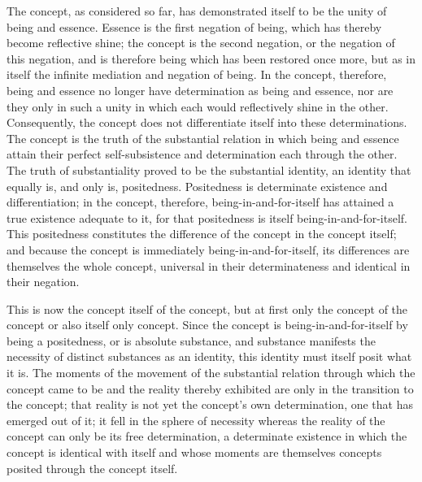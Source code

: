 The concept, as considered so far,
has demonstrated itself to be
the unity of being and essence.
Essence is the first negation of being,
which has thereby become reflective shine;
the concept is the second negation,
or the negation of this negation,
and is therefore being
which has been restored once more,
but as in itself the infinite mediation
and negation of being.
In the concept, therefore,
being and essence no longer have
determination as being and essence,
nor are they only in such a unity
in which each would reflectively shine in the other.
Consequently, the concept does not differentiate
itself into these determinations.
The concept is the truth of the substantial relation
in which being and essence attain their perfect
self-subsistence and determination each through the other.
The truth of substantiality proved
to be the substantial identity,
an identity that equally is,
and only is, positedness.
Positedness is determinate existence and differentiation;
in the concept, therefore, being-in-and-for-itself
has attained a true existence adequate to it,
for that positedness is itself being-in-and-for-itself.
This positedness constitutes the difference
of the concept in the concept itself;
and because the concept is
immediately being-in-and-for-itself,
its differences are themselves the whole concept,
universal in their determinateness
and identical in their negation.

This is now the concept itself of the concept,
but at first only the concept of the concept
or also itself only concept.
Since the concept is being-in-and-for-itself
by being a positedness, or is absolute substance,
and substance manifests the necessity of
distinct substances as an identity,
this identity must itself posit what it is.
The moments of the movement of the substantial relation
through which the concept came to be
and the reality thereby exhibited are
only in the transition to the concept;
that reality is not yet the
concept's own determination,
one that has emerged out of it;
it fell in the sphere of necessity
whereas the reality of the concept
can only be its free determination,
a determinate existence in which
the concept is identical with itself
and whose moments are themselves concepts
posited through the concept itself.

